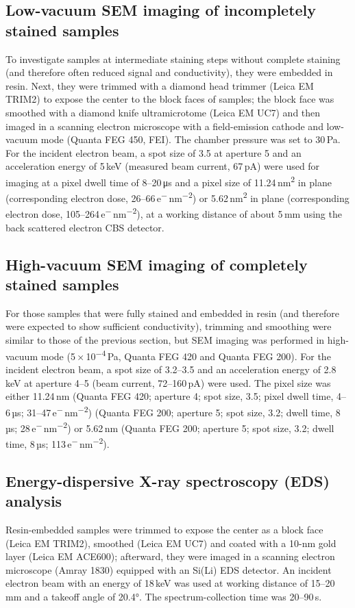 \documentclass{article}
\begin{document}
\subsection*{Low-vacuum SEM imaging of incompletely stained samples}
To investigate samples at intermediate staining steps without complete staining (and therefore often reduced signal and conductivity), they were embedded in resin. Next, they were trimmed with a diamond head trimmer (Leica EM TRIM2) to expose the center to the block faces of samples; the block face was smoothed with a diamond knife ultramicrotome (Leica EM UC7) and then imaged in a scanning electron microscope with a field-emission cathode and low-vacuum mode (Quanta FEG 450, FEI). The chamber pressure was set to 30\,Pa. For the incident electron beam, a spot size of 3.5 at aperture 5 and an acceleration energy of 5\,keV (measured beam current, 67\,pA) were used for imaging at a pixel dwell time of 8–20\,μs and a pixel size of 11.24\,nm\textsuperscript{2} in plane (corresponding electron dose, 26–66\,e\textsuperscript{−}\,nm\textsuperscript{−2}) or 5.62\,nm\textsuperscript{2} in plane (corresponding electron dose, 105–264\,e\textsuperscript{−}\,nm\textsuperscript{−2}), at a working distance of about 5\,mm using the back scattered electron CBS detector.

\subsection*{High-vacuum SEM imaging of completely stained samples}
For those samples that were fully stained and embedded in resin (and therefore were expected to show sufficient conductivity), trimming and smoothing were similar to those of the previous section, but SEM imaging was performed in high-vacuum mode (5\,×\,10\textsuperscript{−4}\,Pa, Quanta FEG 420 and Quanta FEG 200). For the incident electron beam, a spot size of 3.2–3.5 and an acceleration energy of 2.8\,keV at aperture 4–5 (beam current, 72–160\,pA) were used. The pixel size was either 11.24\,nm (Quanta FEG 420; aperture 4; spot size, 3.5; pixel dwell time, 4–6\,µs; 31–47\,e\textsuperscript{−}\,nm\textsuperscript{−2}) (Quanta FEG 200; aperture 5; spot size, 3.2; dwell time, 8\,µs; 28\,e\textsuperscript{−}\,nm\textsuperscript{−2}) or 5.62\,nm (Quanta FEG 200; aperture 5; spot size, 3.2; dwell time, 8\,µs; 113\,e\textsuperscript{−}\,nm\textsuperscript{−2}).

\subsection*{Energy-dispersive X-ray spectroscopy (EDS) analysis}
Resin-embedded samples were trimmed to expose the center as a block face (Leica EM TRIM2), smoothed (Leica EM UC7) and coated with a 10-nm gold layer (Leica EM ACE600); afterward, they were imaged in a scanning electron microscope (Amray 1830) equipped with an Si(Li) EDS detector. An incident electron beam with an energy of 18\,keV was used at working distance of 15–20\,mm and a takeoff angle of 20.4°. The spectrum-collection time was 20–90\,s.
\end{document}
